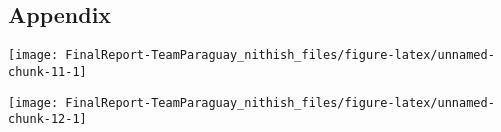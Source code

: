 \documentclass[]{article}
\begin{document}
\hypertarget{appendix}{%
\subsection{Appendix}\label{appendix}}

\begin{center}\texttt{[image: FinalReport-TeamParaguay\_nithish\_files/figure-latex/unnamed-chunk-11-1]} \end{center}

\begin{center}\texttt{[image: FinalReport-TeamParaguay\_nithish\_files/figure-latex/unnamed-chunk-12-1]} \end{center}
\end{document}

